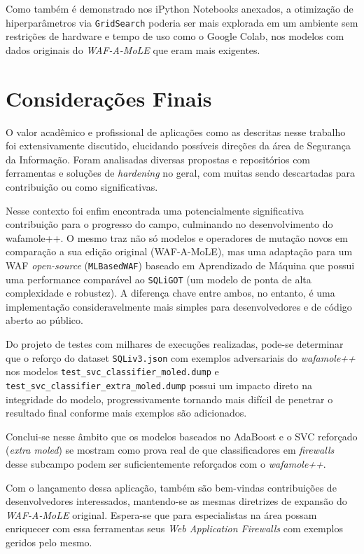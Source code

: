 Como também é demonstrado nos iPython Notebooks anexados, a otimização de hiperparâmetros via \verb+GridSearch+ poderia ser mais explorada em um ambiente sem restrições de hardware e tempo de uso como o Google Colab, nos modelos com dados originais do \textit{WAF-A-MoLE} que eram mais exigentes. 

\section{Considerações Finais}
O valor acadêmico e profissional de aplicações como as descritas nesse trabalho foi extensivamente discutido, elucidando possíveis direções da área de Segurança da Informação. Foram analisadas diversas propostas e repositórios com ferramentas e soluções de \textit{hardening} no geral, com muitas sendo descartadas para contribuição ou como significativas. 

Nesse contexto foi enfim encontrada uma potencialmente significativa contribuição para o progresso do campo, culminando no desenvolvimento do wafamole++. O mesmo traz não só modelos e operadores de mutação novos em comparação a sua edição original (WAF-A-MoLE), mas uma adaptação para um WAF \textit{open-source} (\verb+MLBasedWAF+) baseado em Aprendizado de Máquina que possui uma performance comparável ao \verb+SQLiGOT+ (um modelo de ponta de alta complexidade e robustez). A diferença chave entre ambos, no entanto, é uma implementação consideravelmente mais simples para desenvolvedores e de código aberto ao público.

Do projeto de testes com milhares de execuções realizadas, pode-se determinar que o reforço do dataset \verb+SQLiv3.json+ com exemplos adversariais do \textit{wafamole++} nos modelos \verb+test_svc_classifier_moled.dump+ e \verb+test_svc_classifier_extra_moled.dump+ possui um impacto direto na integridade do modelo, progressivamente tornando mais difícil de penetrar o resultado final conforme mais exemplos são adicionados.

Conclui-se nesse âmbito que os modelos baseados no AdaBoost e o SVC reforçado (\textit{extra moled}) se mostram como prova real de que classificadores em \textit{firewalls} desse subcampo podem ser suficientemente reforçados com o \textit{wafamole++}.

Com o lançamento dessa aplicação, também são bem-vindas contribuições de desenvolvedores interessados, mantendo-se as mesmas diretrizes de expansão do \textit{WAF-A-MoLE} original. Espera-se que para especialistas na área possam enriquecer com essa ferramentas seus \textit{Web Application Firewalls}  com exemplos geridos pelo mesmo.
